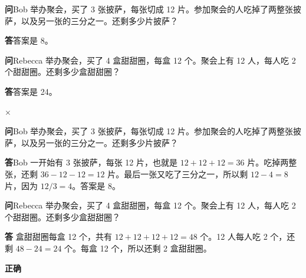 \begingroup
\small
{}
\begin{minipage}[t]{.466\linewidth}
\par
\begin{tcolorbox}[cotpanel,title={模型输入}]
\textbf{问}\enspace Bob 举办聚会，买了 3 张披萨，每张切成 12 片。参加聚会的人吃掉了两整张披萨，以及另一张的三分之一。还剩多少片披萨？

\textbf{答}\enspace 答案是 8。

\textbf{问}\enspace Rebecca 举办聚会，买了 4 盒甜甜圈，每盒 12 个。聚会上有 12 人，每人吃 2 个甜甜圈。还剩多少盒甜甜圈？
\end{tcolorbox}
\begin{tcolorbox}[cotpanel,title={模型输出}]
\textbf{答}\enspace 答案是 24。\par
\hfill\textcolor{red!75!black}{\(\times\)}
\end{tcolorbox}
\end{minipage}\hfill
\begin{minipage}[t]{.502\linewidth}
\par
\begin{tcolorbox}[cotpanel,title={模型输入}]
\textbf{问}\enspace Bob 举办聚会，买了 3 张披萨，每张切成 12 片。参加聚会的人吃掉了两整张披萨，以及另一张的三分之一。还剩多少片披萨？

\textbf{答}\enspace Bob 一开始有 3 张披萨，每张 12 片，也就是 \(12+12+12=36\) 片。吃掉两整张，还剩 \(36-12-12=12\) 片。最后一张又吃了三分之一，所以剩 \(12-4=8\) 片，因为 \(12/3=4\)。答案是 8。

\textbf{问}\enspace Rebecca 举办聚会，买了 4 盒甜甜圈，每盒 12 个。聚会上有 12 人，每人吃 2 个甜甜圈。还剩多少盒甜甜圈？
\end{tcolorbox}
\begin{tcolorbox}[cotpanel,title={模型输出}]
\textbf{答} 盒甜甜圈每盒 12 个，共有 \(12+12+12+12=48\) 个。12 人每人吃 2 个，还剩 \(48-24=24\) 个。每盒 12 个，所以还剩 2 盒甜甜圈。\par
\hfill\textcolor{green!50!black}{\bfseries 正确}
\end{tcolorbox}
\end{minipage}
\endgroup
